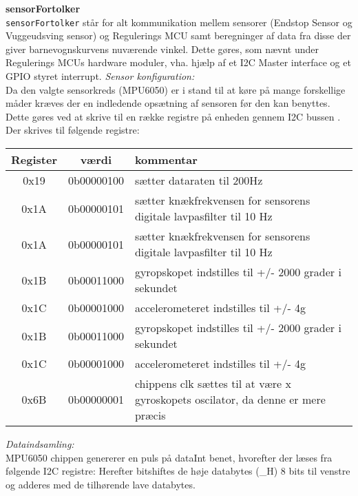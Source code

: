 \label{vugsys:impl, sensFortolk}\textbf{sensorFortolker}  \\
\verb+sensorFortolker+ står for alt kommunikation mellem sensorer (Endstop Sensor og Vuggeudsving sensor) og Regulerings MCU samt beregninger af data fra disse der giver barnevognskurvens nuværende vinkel. Dette gøres, som nævnt under Regulerings MCUs hardware moduler, vha. hjælp af et I2C Master interface og et GPIO styret interrupt. 
\textit{Sensor konfiguration:} \\
Da den valgte sensorkreds (MPU6050) er i stand til at køre på mange forskellige måder kræves der en indledende opsætning af sensoren før den kan benyttes. Dette gøres ved at skrive til en række registre på enheden gennem I2C bussen \citep{I2C}. Der skrives til følgende registre:
\begin{center}
    \begin{tabular}{| c | c | p{8cm} |}
    \hline
    \textbf{Register}	& \textbf{værdi} & \textbf{kommentar} \\ \hline
    0x19 & 0b00000100 & sætter dataraten til 200Hz \\
    0x1A & 0b00000101 & sætter knækfrekvensen for sensorens digitale lavpasfilter til 10 Hz \\
    0x1A & 0b00000101 & sætter knækfrekvensen for sensorens digitale lavpasfilter til 10 Hz \\
    0x1B & 0b00011000 & gyropskopet indstilles til +/- 2000 grader i sekundet  \\
    0x1C & 0b00001000 & accelerometeret indstilles til +/- 4g \\
    0x1B & 0b00011000 & gyropskopet indstilles til +/- 2000 grader i sekundet  \\
    0x1C & 0b00001000 & accelerometeret indstilles til +/- 4g \\
    0x6B & 0b00000001 & chippens clk sættes til at være x gyroskopets oscilator, da denne er mere præcis \\ \hline
    \end{tabular}
\end{center}
\textit{Dataindsamling:} \\
MPU6050 chippen genererer en puls på dataInt benet, hvorefter der læses fra følgende I2C registre:
Herefter bitshiftes de høje databytes (\_H) 8 bits til venstre og adderes med de tilhørende lave databytes.


